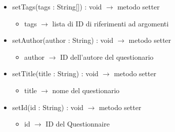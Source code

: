 \begin{description}
\begin{itemize}
	\item setTags(tags : String[]) : void $\rightarrow$ metodo setter\begin{itemize}
		\item tags $\rightarrow$ lista di ID di riferimenti ad argomenti 
	\end{itemize}
	
	\item setAuthor(author : String) : void $\rightarrow$ metodo setter\begin{itemize}
		\item author $\rightarrow$ ID dell'autore del questionario
	\end{itemize}
	
	\item setTitle(title : String) : void $\rightarrow$ metodo setter\begin{itemize}
		\item title $\rightarrow$ nome del questionario
	\end{itemize}
	
	\item setId(id : String) : void $\rightarrow$ metodo setter\begin{itemize}
		\item id $\rightarrow$ ID del Questionnaire
	\end{itemize}
	
\end{itemize}

\end{description}

